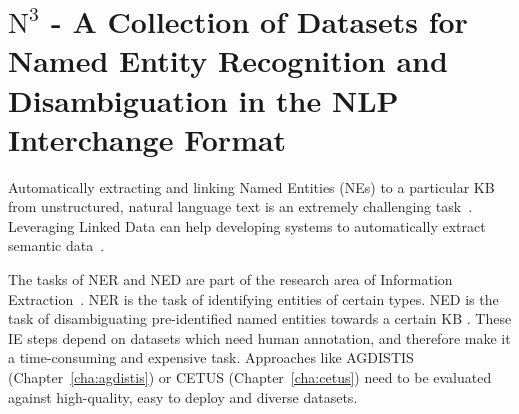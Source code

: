 \chapter[$\mbox{N}^3$ - A Collection of Datasets for NER and NED in NIF]{$\mbox{N}^3$ - A Collection of Datasets for Named Entity Recognition and Disambiguation in the NLP Interchange Format}
\label{cha:N3}


Automatically extracting and linking Named Entities (NEs) to a particular \ac{KB}  from unstructured, natural language text is an extremely challenging task~\cite{Cucerzan07}. 
Leveraging Linked Data can help developing systems to automatically extract semantic data~\cite{GER+13,AIDA,spotlight,agdistis_iswc}.

The tasks of \ac{NER}  and \ac{NED}  are part of the research area of Information Extraction~\cite{FOX}.
NER is the task of identifying entities of certain types.
NED is the task of disambiguating pre-identified named entities towards a certain \ac{KB} .
These IE steps depend on datasets which need human annotation, and therefore make it a time-consuming and expensive task.
Approaches like AGDISTIS (Chapter~\ref{cha:agdistis}) or CETUS (Chapter~\ref{cha:cetus}) need to be evaluated against high-quality, easy to deploy and diverse datasets.

